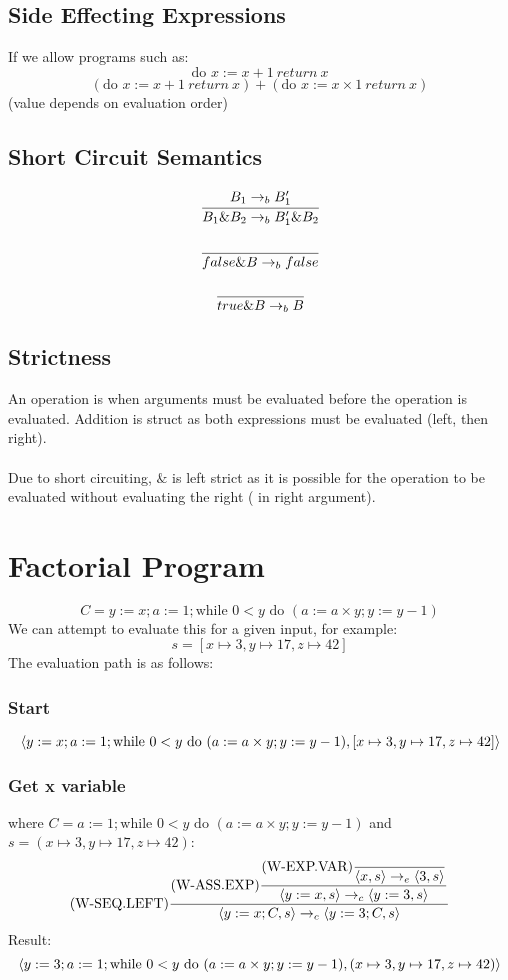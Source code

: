 \documentclass{report}
\begin{document}
        \subsection*{Side Effecting Expressions}
            If we allow programs such as:
            \[\text{do } x := x + 1 \ return \ x\]
            \[(\text{do } x := x + 1 \ return \ x) + (\text{do } x := x \times 1 \ return \ x)\]
            (value depends on evaluation order)
        \subsection*{Short Circuit Semantics}
            \[\cfrac{B_1 \to_b B'_1}{B_1 \& B_2 \to_b B_1' \& B_2}\]
            \[\cfrac{}{false \& B \to_b false}\]
            \[\cfrac{}{true \& B \to_b B}\]
        \subsection*{Strictness}
            An operation is  when arguments must be evaluated before the operation is evaluated. Addition is struct as both expressions must be evaluated (left, then right).
            \\
            \\ Due to short circuiting, $\&$ is left strict as it is possible for the operation to be evaluated without evaluating the right ( in right argument). 

    \section*{Factorial Program}
            \[C = y:= x; a:= 1;\text{while }0<y \text{ do } (a:= a \times y; y:= y - 1)\]
            We can attempt to evaluate this for a given input, for example:
            \[s = [x \mapsto 3, y \mapsto 17, z \mapsto 42]\]
            The evaluation path is as follows:
            \subsubsection*{Start}
                \[\langle y:= x; a:= 1;\text{while }0<y \text{ do } (a:= a \times y; y:= y - 1), [x \mapsto 3, y \mapsto 17, z \mapsto 42] \rangle\]
            \subsubsection*{Get x variable}
                where $C = a:= 1;\text{while }0<y \text{ do } (a:= a \times y; y:= y - 1)$ and $s = (x \mapsto 3, y \mapsto 17, z \mapsto 42)$:
                \[\text{(W-SEQ.LEFT)}\dfrac{
                    \text{(W-ASS.EXP)}\dfrac{
                        \text{(W-EXP.VAR)}\dfrac{}{\langle x, s \rangle \to_e \langle 3, s \rangle}
                    }{\langle y:= x, s \rangle \to_c \langle y := 3, s \rangle}
                }{\langle y:= x; C, s \rangle \to_c \langle y:=3;C, s \rangle}\]
                Result:
                \[\langle y:= 3; a:= 1;\text{while }0<y \text{ do } (a:= a \times y; y:= y - 1), (x \mapsto 3, y \mapsto 17, z \mapsto 42) \rangle\]
\end{document}
